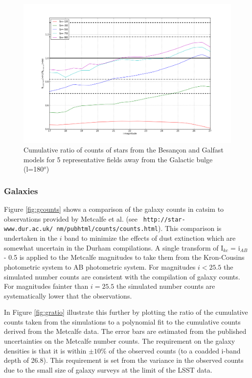 \documentclass[]{article}
\begin{document}
\begin{figure}[h]
\centering
\includegraphics[width=5in]{validation_figures/cumulative_ratio_stars_180_besancon_dust.png}
\caption{Cumulative ratio of counts of stars from the Besan\c{c}on and Galfast models for 5 representative fields away from the Galactic bulge (l=180$^o$) \label{fig:sratio_180}}
\end{figure}

\subsubsection{Galaxies \label{sec:galaxycounts}}

Figure \ref{fig:gcounts} shows a comparison of the galaxy counts in
catsim to observations provided by Metcalfe et al. (see {\tt
  http://star-www.dur.ac.uk/~nm/pubhtml/counts/counts.html}).  This
comparison is undertaken in the $i$ band to minimize the effects of
dust extinction which are somewhat uncertain in the Durham
compilations.  A single transform of I$_{kc}$ = i$_{AB}$ - 0.5 is
applied to the Metcalfe magnitudes to take them from the Kron-Cousins
photometric system to AB photometric system. For magnitudes $i<25.5$
the simulated number counts are consistent with the compilation of
galaxy counts. For magnitudes fainter than $i=25.5$ the simulated
number counts are systematically lower that the observations.

In Figure \ref{fig:gratio} illustrate this further by plotting the
ratio of the cumulative counts taken from the simulations to a
polynomial fit to the cumulative counts derived from the Metcalfe
data.  The error bars are estimated from the published uncertainties
on the Metcalfe number counts. The requirement on the galaxy densities
is that it is within $\pm10\%$ of the observed counts (to a coadded
i-band depth of 26.8). This requirement is set from the variance in
the observed counts due to the small size of galaxy surveys at the
limit of the LSST data.
\end{document}
